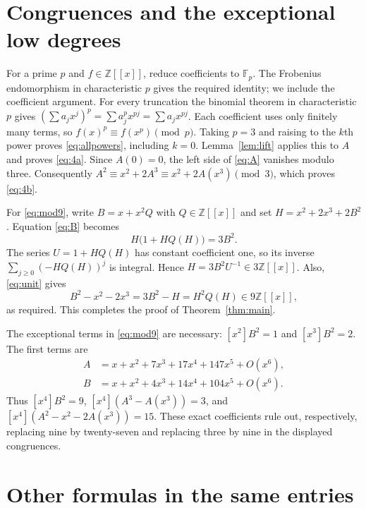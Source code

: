 \documentclass[11pt]{article}
\newcommand{\Z}{\mathbb Z}
\newcommand{\Fp}{\mathbb F}
\newcommand{\coef}[2]{[x^{#1}]#2}
\begin{document}
\section{Congruences and the exceptional low degrees}

For a prime $p$ and $f\in\Z[[x]]$, reduce coefficients to $\Fp_p$.
The Frobenius endomorphism in characteristic $p$ \cite{stacks} gives
the required identity; we include the coefficient argument.
For every truncation the binomial theorem in characteristic $p$ gives
$(\sum a_jx^j)^p=\sum a_j^p x^{pj}=\sum a_jx^{pj}$.
Each coefficient uses only finitely many terms, so
$f(x)^p\equiv f(x^p)\pmod p$. Taking $p=3$ and raising to the $k$th
power proves \eqref{eq:allpowers}, including $k=0$.
Lemma~\ref{lem:lift} applies this to $A$ and proves \eqref{eq:4a}.
Since $A(0)=0$, the left side of \eqref{eq:A} vanishes modulo three.
Consequently $A^2\equiv x^2+2A^3\equiv x^2+2A(x^3)\pmod3$,
which proves \eqref{eq:4b}.

For \eqref{eq:mod9}, write $B=x+x^2Q$ with $Q\in\Z[[x]]$ and set
$H=x^2+2x^3+2B^2$. Equation \eqref{eq:B} becomes
\begin{equation}\label{eq:unit}
 H\bigl(1+H Q(H)\bigr)=3B^2.
\end{equation}
The series $U=1+H Q(H)$ has constant coefficient one, so its inverse
$\sum_{j\geq0}(-H Q(H))^j$ is integral. Hence
$H=3B^2U^{-1}\in3\Z[[x]]$. Also, \eqref{eq:unit} gives
\[
 B^2-x^2-2x^3=3B^2-H=H^2Q(H)\in9\Z[[x]],
\]
as required. This completes the proof of Theorem~\ref{thm:main}.

The exceptional terms in \eqref{eq:mod9} are necessary:
$\coef2{B^2}=1$ and $\coef3{B^2}=2$.
The first terms are
\begin{align*}
 A&=x+x^2+7x^3+17x^4+147x^5+O(x^6),\\
 B&=x+x^2+4x^3+14x^4+104x^5+O(x^6).
\end{align*}
Thus $\coef4{B^2}=9$, $\coef4{(A^3-A(x^3))}=3$, and
$\coef4{(A^2-x^2-2A(x^3))}=15$.
These exact coefficients rule out, respectively, replacing nine by
twenty-seven and replacing three by nine in the displayed congruences.

\section{Other formulas in the same entries}
\end{document}
